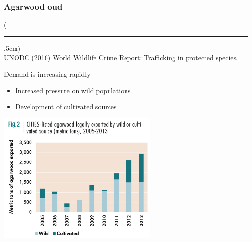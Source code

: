 \documentclass[10pt]{beamer}
\newenvironment{reference}[2]{%
	\begin{textblock*}{\textwidth}(#1,#2)
		\tiny\bgroup\color{gray}}{\egroup\end{textblock*}}
\begin{document}
\begin{frame}[t]
\frametitle{Agarwood oud}
\vspace{0.5cm}

	\begin{reference}{4mm}{92mm}
		\rule{1.5cm}{0.25pt}\\
		UNODC (2016) World Wildlife Crime Report: Trafficking in protected species.
	\end{reference}

	Demand is increasing rapidly
		\smallskip
		\begin{itemize}
			\item Increased pressure on wild populations
			\smallskip
			\item Development of cultivated sources
		\end{itemize}
	
	\vspace{0.25cm}
	
	\begin{center}
		\includegraphics[width=0.6\textwidth]{figures/agarwood_trends.png}
	\end{center}	
\end{frame}
\end{document}
